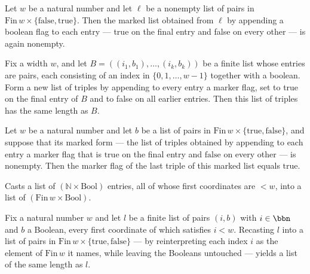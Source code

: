 \begin{lemma}
\label{SwitchingLemma.markLast_ne_nil}
\leanok
{}
Let $w$ be a natural number and let $\ell$ be a nonempty list of pairs in
$\mathrm{Fin}\,w \times \{\mathrm{false},\mathrm{true}\}$. Then the marked list obtained
from $\ell$ by appending a boolean flag to each entry — true on the final entry and
false on every other — is again nonempty.
\end{lemma}

\begin{lemma}
\label{SwitchingLemma.markLast_length}
\leanok
{}
Fix a width $w$, and let $B = ((i_1,b_1),\dots,(i_k,b_k))$ be a finite list whose
entries are pairs, each consisting of an index in $\{0,1,\dots,w-1\}$ together with a
boolean. Form a new list of triples by appending to every entry a marker flag, set to
true on the final entry of $B$ and to false on all earlier entries. Then this list of
triples has the same length as $B$.
\end{lemma}

\begin{lemma}
\label{SwitchingLemma.markLast_getLast_true}
\leanok
{}
Let $w$ be a natural number and let $b$ be a list of pairs in $\mathrm{Fin}\,w \times
\{\mathrm{true},\mathrm{false}\}$, and suppose that its marked form — the list of
triples obtained by appending to each entry a marker flag that is $\mathrm{true}$ on the
final entry and $\mathrm{false}$ on every other — is nonempty. Then the marker flag of
the last triple of this marked list equals $\mathrm{true}$.
\end{lemma}

\begin{definition}
\label{SwitchingLemma.toFinBlock}
\leanok
Casts a list of $(\mathbb{N} \times \mathrm{Bool})$ entries, all of whose first
coordinates are $< w$, into a list of $(\mathrm{Fin}\,w \times \mathrm{Bool})$.
\end{definition}

\begin{lemma}
\label{SwitchingLemma.toFinBlock_length}
\leanok
{}
Fix a natural number $w$ and let $l$ be a finite list of pairs $(i, b)$ with $i \in
\bbn$ and $b$ a Boolean, every first coordinate of which satisfies $i < w$. Recasting
$l$ into a list of pairs in $\mathrm{Fin}\,w \times \{\text{true}, \text{false}\}$ — by
reinterpreting each index $i$ as the element of $\mathrm{Fin}\,w$ it names, while
leaving the Booleans untouched — yields a list of the same length as $l$.
\end{lemma}

